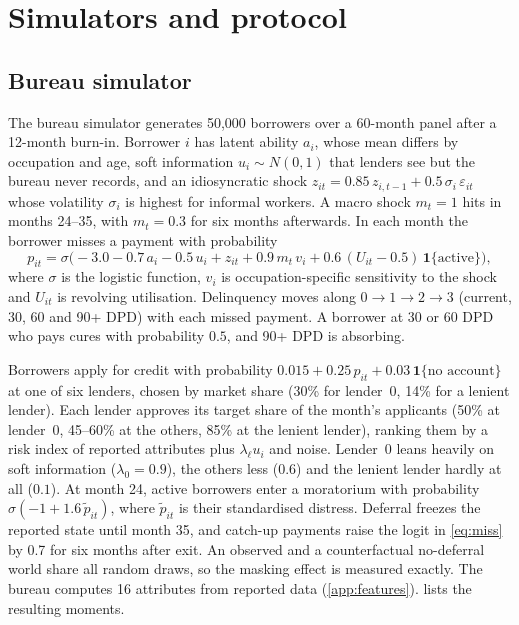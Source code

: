 \documentclass[10pt]{article}
\newcommand{\ind}{\mathbf{1}}
\begin{document}
\section{Simulators and protocol}\label{sec:sim}

\subsection{Bureau simulator}

The bureau simulator generates 50,000 borrowers over a 60-month panel after a 12-month burn-in. Borrower $i$ has latent ability $a_i$, whose mean differs by occupation and age, soft information $u_i\sim N(0,1)$ that lenders see but the bureau never records, and an idiosyncratic shock $z_{it} = 0.85\,z_{i,t-1} + 0.5\,\sigma_i\,\varepsilon_{it}$ whose volatility $\sigma_i$ is highest for informal workers. A macro shock $m_t=1$ hits in months 24--35, with $m_t = 0.3$ for six months afterwards. In each month the borrower misses a payment with probability
\begin{equation}\label{eq:miss}
p_{it} = \sigma\big(-3.0 - 0.7\,a_i - 0.5\,u_i + z_{it} + 0.9\,m_t\,v_i + 0.6\,(U_{it}-0.5)\,\ind\{\text{active}\}\big),
\end{equation}
where $\sigma$ is the logistic function, $v_i$ is occupation-specific sensitivity to the shock and $U_{it}$ is revolving utilisation. Delinquency moves along $0\to1\to2\to3$ (current, 30, 60 and 90+ DPD) with each missed payment. A borrower at 30 or 60 DPD who pays cures with probability $0.5$, and 90+ DPD is absorbing.

Borrowers apply for credit with probability $0.015 + 0.25\,p_{it} + 0.03\,\ind\{\text{no account}\}$ at one of six lenders, chosen by market share (30\% for lender~0, 14\% for a lenient lender). Each lender approves its target share of the month's applicants (50\% at lender~0, 45--60\% at the others, 85\% at the lenient lender), ranking them by a risk index of reported attributes plus $\lambda_\ell u_i$ and noise. Lender~0 leans heavily on soft information ($\lambda_0 = 0.9$), the others less ($0.6$) and the lenient lender hardly at all ($0.1$). At month 24, active borrowers enter a moratorium with probability $\sigma(-1 + 1.6\,\tilde p_{it})$, where $\tilde p_{it}$ is their standardised distress. Deferral freezes the reported state until month 35, and catch-up payments raise the logit in \eqref{eq:miss} by 0.7 for six months after exit. An observed and a counterfactual no-deferral world share all random draws, so the masking effect is measured exactly. The bureau computes 16 attributes from reported data (\cref{app:features}).  lists the resulting moments.
\end{document}
